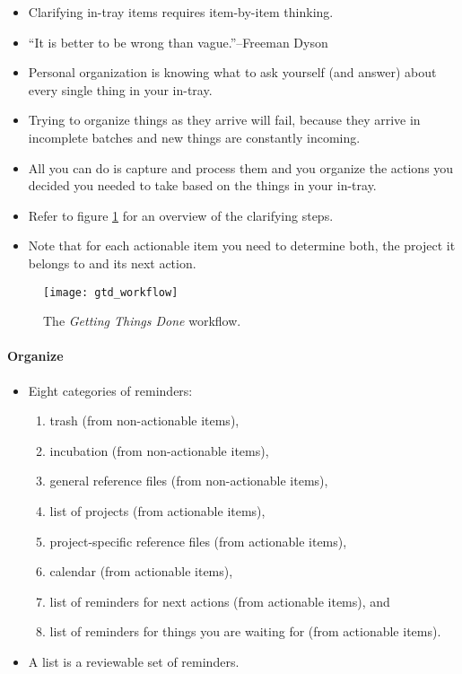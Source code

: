 \documentclass{article}
\begin{document}
\begin{itemize}
  \item Clarifying in-tray items requires item-by-item thinking.
  \item ``It is better to be wrong than vague.''--Freeman Dyson
  \item Personal organization is knowing what to ask yourself (and answer) about every single thing in your in-tray.
  \item Trying to organize things as they arrive will fail, because they arrive in incomplete batches and new things are constantly incoming.
  \item All you can do is capture and process them and you organize the actions you decided you needed to take based on the things in your in-tray.
  \item Refer to figure \ref{fig:gtd_workflow} for an overview of the clarifying steps.
  \item Note that for each actionable item you need to determine both, the project it belongs to and its next action.
\end{itemize}

\begin{figure}[htp]
  \centering
  \texttt{[image: gtd\_workflow]}
  \caption{The \textit{Getting Things Done} workflow.}
  \label{fig:gtd_workflow}
\end{figure}

\paragraph{Organize}

\begin{itemize}
  \item Eight categories of reminders:
  \begin{enumerate}
    \item trash (from non-actionable items),
    \item incubation (from non-actionable items),
    \item general reference files (from non-actionable items),
    \item list of projects (from actionable items),
    \item project-specific reference files (from actionable items),
    \item calendar (from actionable items),
    \item list of reminders for next actions (from actionable items), and
    \item list of reminders for things you are waiting for (from actionable items).
  \end{enumerate}
  \item A list is a reviewable set of reminders.
\end{itemize}
\end{document}
